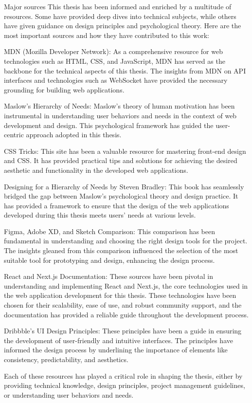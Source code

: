 \begin{section}{Major sources}
    \label{sec:major-sources}
    This thesis has been informed and enriched by a multitude of resources.
    Some have provided deep dives into technical subjects, while others have given guidance on design principles and psychological theory.
    Here are the most important sources and how they have contributed to this work:

    MDN (Mozilla Developer Network): As a comprehensive resource for web technologies such as HTML, CSS, and JavaScript, MDN has served as the backbone for the technical aspects of this thesis.
    The insights from MDN on API interfaces and technologies such as WebSocket have provided the necessary grounding for building web applications.

    Maslow's Hierarchy of Needs: Maslow's theory of human motivation has been instrumental in understanding user behaviors and needs in the context of web development and design.
    This psychological framework has guided the user-centric approach adopted in this thesis.

    CSS Tricks: This site has been a valuable resource for mastering front-end design and CSS.
    It has provided practical tips and solutions for achieving the desired aesthetic and functionality in the developed web applications.

    Designing for a Hierarchy of Needs by Steven Bradley: This book has seamlessly bridged the gap between Maslow's psychological theory and design practice.
    It has provided a framework to ensure that the design of the web applications developed during this thesis meets users' needs at various levels.

    Figma, Adobe XD, and Sketch Comparison: This comparison has been fundamental in understanding and choosing the right design tools for the project.
    The insights gleaned from this comparison influenced the selection of the most suitable tool for prototyping and design, enhancing the design process.

    React and Next.js Documentation: These sources have been pivotal in understanding and implementing React and Next.js, the core technologies used in the web application development for this thesis.
    These technologies have been chosen for their scalability, ease of use, and robust community support, and the documentation has provided a reliable guide throughout the development process.

    Dribbble's UI Design Principles: These principles have been a guide in ensuring the development of user-friendly and intuitive interfaces.
    The principles have informed the design process by underlining the importance of elements like consistency, predictability, and aesthetics.

    Each of these resources has played a critical role in shaping the thesis, either by providing technical knowledge, design principles, project management guidelines, or understanding user behaviors and needs.
\end{section}

